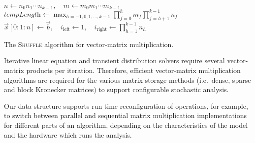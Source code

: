 \begin{algorithm}
  $n \gets n_0 n_1 \cdots n_{k - 1},\quad m \gets m_0 m_1 \cdots m_{k - 1}$\;
  $\textit{tempLength} \gets \max_{h = -1, 0, 1, \ldots, k - 1} \prod_{f =
    0}^h m_f \prod_{f = h + 1}^{k - 1} n_f$\;
  \;
  $\vec{x}[0{:}1{:}n] \gets \vec{b},\quad
  i_{\text{left}} \gets 1,\quad
  i_{\text{right}} \gets \prod_{h = 1}^{k - 1} n_h$\;
  \;
  \caption{The \textsc{Shuffle} algorithm for vector-matrix
    multiplication.}
  \label{alg:algorithms:matmul:shuffle}
\end{algorithm}

Iterative linear equation and transient distribution solvers require
several vector-matrix products per iteration. Therefore, efficient
vector-matrix multiplication algorithms are required for the various
matrix storage methods (i.e.~dense, sparse and block Kronecker
matrices) to support configurable stochastic analysis.

Our data structure supports run-time reconfiguration of operations,
for example, to switch between parallel and sequential matrix
multiplication implementations for different parts of an
algorithm, depending on the characteristics of the model and the
hardware which runs the analysis.

